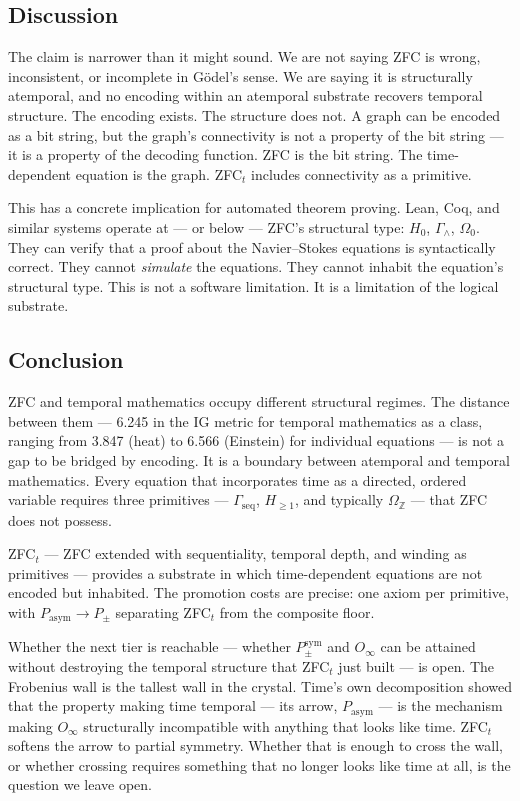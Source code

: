 \documentclass[12pt,a4paper]{article}
\begin{document}
\subsection{Discussion}

The claim is narrower than it might sound. We are not saying ZFC is wrong, inconsistent, or incomplete in Gödel's sense. We are saying it is structurally atemporal, and no encoding within an atemporal substrate recovers temporal structure. The encoding exists. The structure does not. A graph can be encoded as a bit string, but the graph's connectivity is not a property of the bit string --- it is a property of the decoding function. ZFC is the bit string. The time-dependent equation is the graph. ZFC$_t$ includes connectivity as a primitive.

This has a concrete implication for automated theorem proving. Lean, Coq, and similar systems operate at --- or below --- ZFC's structural type: $H_0$, $\Gamma_{\wedge}$, $\Omega_0$. They can verify that a proof about the Navier--Stokes equations is syntactically correct. They cannot \emph{simulate} the equations. They cannot inhabit the equation's structural type. This is not a software limitation. It is a limitation of the logical substrate.

\subsection{Conclusion}

ZFC and temporal mathematics occupy different structural regimes. The distance between them --- 6.245 in the IG metric for temporal mathematics as a class, ranging from 3.847 (heat) to 6.566 (Einstein) for individual equations --- is not a gap to be bridged by encoding. It is a boundary between atemporal and temporal mathematics. Every equation that incorporates time as a directed, ordered variable requires three primitives --- $\Gamma_\text{seq}$, $H_{\geq 1}$, and typically $\Omega_\mathbb{Z}$ --- that ZFC does not possess.

ZFC$_t$ --- ZFC extended with sequentiality, temporal depth, and winding as primitives --- provides a substrate in which time-dependent equations are not encoded but inhabited. The promotion costs are precise: one axiom per primitive, with $P_\text{asym} \to P_{\pm}$ separating ZFC$_t$ from the composite floor.

Whether the next tier is reachable --- whether $P_{\pm}^{\text{sym}}$ and $O_{\infty}$ can be attained without destroying the temporal structure that ZFC$_t$ just built --- is open. The Frobenius wall is the tallest wall in the crystal. Time's own decomposition showed that the property making time temporal --- its arrow, $P_\text{asym}$ --- is the mechanism making $O_{\infty}$ structurally incompatible with anything that looks like time. ZFC$_t$ softens the arrow to partial symmetry. Whether that is enough to cross the wall, or whether crossing requires something that no longer looks like time at all, is the question we leave open.
\end{document}
